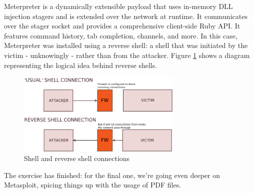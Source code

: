Meterpreter is a dynamically extensible payload that uses in-memory DLL injection stagers and is extended over the network at runtime. 
It communicates over the stager socket and provides a comprehensive client-side Ruby API. It features command history, tab completion, channels, and more.\cite{online:meterpreter} In this case, Meterpreter was installed using a reverse shell: a shell that was initiated by the victim - unknowingly - rather than from the attacker. Figure \ref{fig:ex2:schema_reverse_shell} shows a diagram representing the logical idea behind reverse shells.

\begin{figure}[htbp]
    \centering
    \includegraphics[width=0.7\textwidth]{../drawable/decorations/schema_reverse_shell.png}
    \caption{Shell and reverse shell connections}
    \label{fig:ex2:schema_reverse_shell}
\end{figure}

The exercise has finished: for the final one, we're going even deeper on Metasploit, spicing things up with the usage of PDF files.

\clearpage